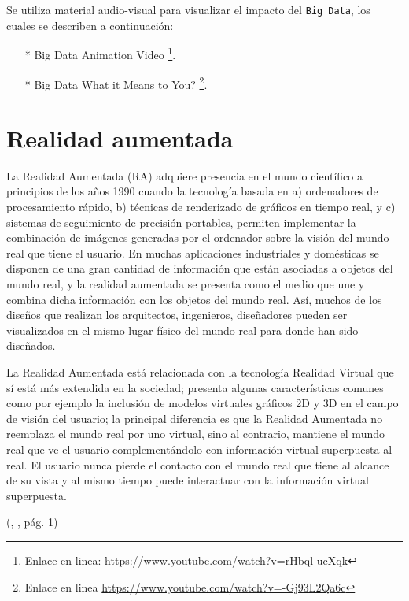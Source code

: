 \documentclass[jou]{apa6} %
\begin{document}
\bigskip

Se utiliza material audio-visual para visualizar el impacto del \texttt{Big Data}, los cuales se describen a continuación:

\begin{enumerate}
\item[*] Big Data Animation Video \footnote{Enlace en linea: \url{https://www.youtube.com/watch?v=rHbql-ucXqk}}.
\item[*] Big Data What it Means to You? \footnote{Enlace en linea \url{https://www.youtube.com/watch?v=-Gj93L2Qa6c}}.
\end{enumerate}

\section{Realidad aumentada}

 \begin{center}
    \begin{minipage}{0.9\linewidth}
        \vspace{5pt}%
        {\normalsize
          La Realidad Aumentada (RA) adquiere presencia en el mundo científico a principios de los años 1990 cuando la tecnología basada en a) ordenadores de procesamiento rápido, b) técnicas de renderizado de gráficos en tiempo real, y c) sistemas de seguimiento de precisión portables, permiten implementar la combinación de imágenes generadas por el ordenador sobre la visión del mundo real que tiene el usuario. En muchas aplicaciones industriales y domésticas se disponen de una gran cantidad de información que están asociadas a objetos del mundo real, y la realidad aumentada se presenta como el medio que une y combina dicha información con los objetos del mundo real. Así, muchos de los diseños que realizan los arquitectos, ingenieros, diseñadores pueden ser visualizados en el mismo lugar físico del mundo real para donde han sido diseñados.

          \bigskip

          La Realidad Aumentada está relacionada con la tecnología Realidad Virtual que sí está más extendida en la sociedad; presenta algunas características comunes como por ejemplo la inclusión de modelos virtuales gráficos 2D y 3D en el campo de visión del usuario; la principal diferencia es que la Realidad Aumentada no reemplaza el mundo real por uno virtual, sino al contrario, mantiene el mundo real que ve el usuario complementándolo con información virtual superpuesta al real. El usuario nunca pierde el contacto con el mundo real que tiene al alcance de su vista y al mismo tiempo puede interactuar con la información virtual superpuesta.
        }
        \begin{flushright}
            (\citeauthor{basogain2007realidad}, , pág. 1)
        \end{flushright}
        \vspace{5pt}%
    \end{minipage}
 \end{center}
 
\end{document}

